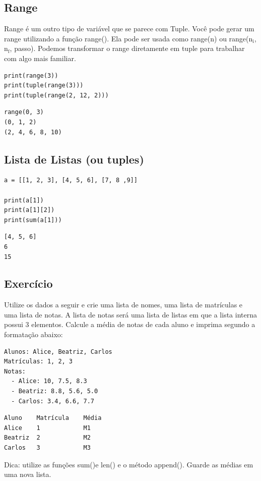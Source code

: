 \documentclass[presentation]{beamer}
\begin{document}
\subsection{Range}
\label{sec:orgheadline54}
Range é um outro tipo de variável que se parece com Tuple. Você pode gerar um range utilizando a função range(). Ela pode ser usada como range(n) ou range(n\(_{\text{i}}\), n\(_{\text{f}}\), passo). Podemos transformar o range diretamente em tuple para trabalhar com algo mais familiar.

\begin{verbatim}
print(range(3))
print(tuple(range(3)))  
print(tuple(range(2, 12, 2)))
\end{verbatim}

\begin{verbatim}
range(0, 3)
(0, 1, 2)
(2, 4, 6, 8, 10)
\end{verbatim}
\subsection{Lista de Listas (ou tuples)}
\label{sec:orgheadline55}
\begin{verbatim}
a = [[1, 2, 3], [4, 5, 6], [7, 8 ,9]]

print(a[1])
print(a[1][2])
print(sum(a[1]))
\end{verbatim}

\begin{verbatim}
[4, 5, 6]
6
15
\end{verbatim}

\subsection{Exercício}
\label{sec:orgheadline56}
Utilize os dados a seguir e crie uma lista de nomes, uma lista de  matrículas e uma lista de notas. A lista de notas será uma lista de listas em que a lista interna possui 3 elementos. Calcule a média de notas de cada aluno e imprima segundo a formatação abaixo:
\begin{verbatim}
Alunos: Alice, Beatriz, Carlos
Matrículas: 1, 2, 3
Notas:
  - Alice: 10, 7.5, 8.3
  - Beatriz: 8.8, 5.6, 5.0
  - Carlos: 3.4, 6.6, 7.7
\end{verbatim}

\begin{verbatim}
Aluno    Matrícula    Média
Alice    1            M1
Beatriz  2            M2
Carlos   3            M3
\end{verbatim}

Dica: utilize as funções sum()e len() e o método append(). Guarde as médias em uma nova lista.
\end{document}
